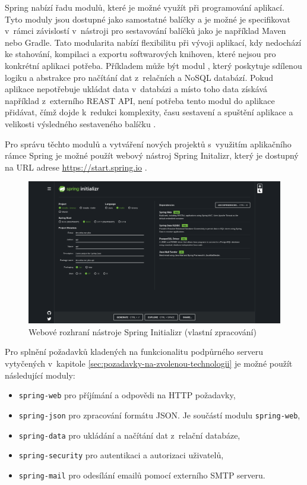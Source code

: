 Spring nabízí řadu modulů, které je možné využít při programování aplikací. Tyto moduly jsou dostupné jako samostatné balíčky a je možné je specifikovat v~rámci závislostí v~nástroji pro sestavování balíčků jako je například Maven nebo Gradle. Tato modularita nabízí flexibilitu při vývoji aplikací, kdy nedochází ke stahování, kompilaci a exportu softwarových knihoven, které nejsou pro konkrétní aplikaci potřeba. Příkladem může být modul , který poskytuje sdílenou logiku a abstrakce pro načítání dat z~relačních a NoSQL databází. Pokud aplikace nepotřebuje ukládat data v~databázi a místo toho data získává například z~externího REAST API, není potřeba tento modul do aplikace přidávat, čímž dojde k~redukci komplexity, času sestavení a spuštění aplikace a velikosti výsledného sestaveného balíčku \cite{spring_boot}.

Pro správu těchto modulů a vytváření nových projektů s~využitím aplikačního rámce Spring je možné použít webový nástroj Spring Initalizr, který je dostupný na URL adrese \url{https://start.spring.io} \cite{spring_boot}.

\begin{figure}[htbp!]\centering
\includegraphics[width=\textwidth]{img/sprint-initializr.png}
\caption{Webové rozhraní nástroje Spring Initializr (vlastní zpracování)}
\label{obr1:SpringInitializr}
\end{figure}

Pro splnění požadavků kladených na funkcionalitu podpůrného serveru vytyčených v~kapitole \ref{sec:pozadavky-na-zvolenou-technologii} je možné použít následující moduly:

\begin{itemize}
    \item \verb|spring-web| pro příjímání a odpovědi na HTTP požadavky,
    \item \verb|spring-json| pro zpracování formátu JSON. Je součástí modulu \verb|spring-web|,
    \item \verb|spring-data| pro ukládání a načítání dat z~relační databáze,
    \item \verb|spring-security| pro autentikaci a autorizaci uživatelů,
    \item \verb|spring-mail| pro odesílání emailů pomocí externího SMTP serveru.
\end{itemize}

